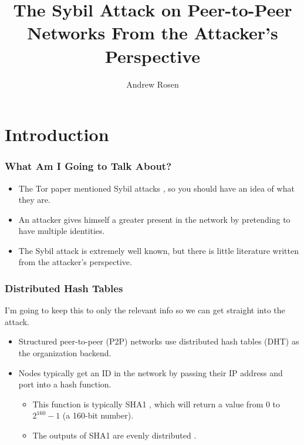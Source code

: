 \documentclass[11pt]{beamer}
\author{Andrew Rosen}
\title{The Sybil Attack on Peer-to-Peer Networks From the Attacker's Perspective}
\institute{Georgia State University}
\begin{document}
    \maketitle
    
    
    \section{Introduction}
    \begin{frame}
        \frametitle[Introduction]{What Am I Going to Talk About? }
        \begin{itemize}
            \item The Tor paper mentioned Sybil attacks \cite{sybil}, so you should have an idea of what they are.
            \item An attacker gives himself a greater present in the network by pretending to have multiple identities.
            \item The Sybil attack is extremely well known, but there is little literature written from the attacker's perspective.
        \end{itemize}
    \end{frame}
    
    
    
    
    \begin{frame}
        \frametitle[DHTs]{Distributed Hash Tables}
        I'm going to keep this to only the relevant info so we can get straight into the attack.
        \begin{itemize}
            \item Structured peer-to-peer (P2P) networks use distributed hash tables (DHT) as the organization backend.
            \item Nodes typically get an ID in the network by passing their IP address and port into a hash function.
            \begin{itemize}
                \item This function is typically SHA1 \cite{sha1}, which will return a value from 0 to $2^{160} -1 $  (a 160-bit number).
                \item The outputs of SHA1  are evenly distributed \cite{bellare2004hash}.
                
            \end{itemize}
            
        \end{itemize}
    \end{frame}
\end{document}
